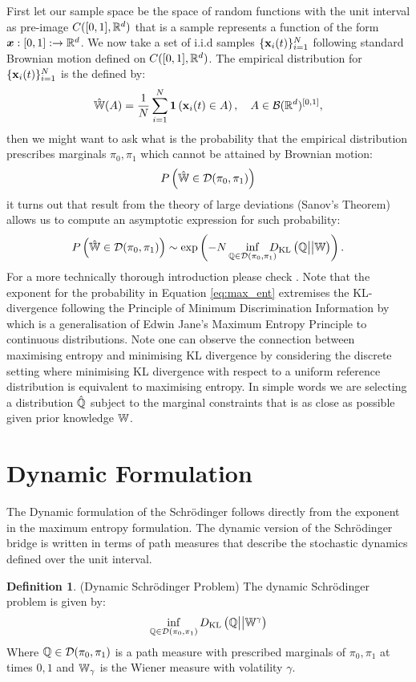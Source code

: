 \documentclass[a4paper,12pt,twoside,openright]{report}
\theoremstyle{definition}
\newtheorem{definition}{Definition}[section]
\begin{document}
First let our sample space be the space of random functions with the unit interval as pre-image $C([0,1], {\mathbb{R}}^d)$ that is a sample  represents a function of the form ${\bm{x}} : [0, 1]:  \rightarrow {\mathbb{R}}^d$.  We now take a set of i.i.d samples $\{{\mathbf{x}}_{i}(t)\}_{i=1}^N$ following standard Brownian motion defined on $C([0,1], {\mathbb{R}}^d)$. The empirical distribution for $\{{\mathbf{x}}_{i}(t)\}_{i=1}^N$ is the defined by:
\begin{align}\label{eq:empirical}
    \hat{\mathbb{W}}(A) = \frac{1}{N}\sum_{i=1}^N {\bm{1}}\left({\mathbf{x}}_i(t) \in A\right)  , \quad A \in {\mathcal{B}}({\mathbb{R}}^d)^{[0,1]},
\end{align}
then we might want to ask what is the probability that the empirical distribution prescribes marginals $\pi_0, \pi_1$ which cannot be attained by Brownian motion:
\begin{align}
    {P}\left(\hat{\mathbb{W}} \in \mathcal{D}(\pi_0, \pi_1) \right)
\end{align}
it turns out that result from the theory of large deviations (Sanov's Theorem) allows us to compute an asymptotic expression for such probability:
\begin{align} \label{eq:max_ent}
    {P}\left(\hat{\mathbb{W}} \in \mathcal{D}(\pi_0, \pi_1) \right) \sim \exp\left(-N\inf_{{\mathbb{Q}} \in {\mathcal{D}}(\pi_0, \pi_1)} \!\!\!\!\!D_{\mathrm{KL}}\left({\mathbb{Q}} \big|\big| \mathbb{W}\right)\right).
\end{align}
For a more technically thorough introduction please check \cite{leonard2013survey}. Note that the exponent for the probability in Equation \ref{eq:max_ent} extremises the KL-divergence following the Principle of Minimum Discrimination Information by \cite{kullback1997information} which is a generalisation of Edwin Jane's Maximum Entropy Principle \citep{jaynes1957information,jaynes2003probability} to continuous distributions. Note one can observe the connection between maximising entropy and minimising KL divergence by considering the discrete setting where minimising KL divergence with respect to a uniform reference distribution is equivalent to maximising entropy. In simple words we are selecting a distribution $\hat{{\mathbb{Q}}}$ subject to the marginal constraints that is as close as possible given prior knowledge $\mathbb{W}$.

\section{Dynamic Formulation}
The Dynamic formulation of the Schrödinger follows directly from the exponent in the maximum entropy formulation.  The dynamic version of the Schrödinger bridge is written in terms of path measures that describe the stochastic dynamics defined over the unit interval.
\begin{definition}
    (Dynamic Schrödinger Problem) The dynamic Schrödinger problem is given by:
    \begin{align}
        \inf_{{\mathbb{Q}} \in {\mathcal{D}}(\pi_0, \pi_1)} D_{\mathrm{KL}}\left({\mathbb{Q}} \big|\big| \mathbb{W}^{\gamma}\right)
    \end{align}
    Where ${\mathbb{Q}} \in {\mathcal{D}}(\pi_0, \pi_1)$ is a path measure with prescribed marginals of $\pi_0, \pi_1$ at times $0, 1$ and $\mathbb{W}_{\gamma}$ is the Wiener measure with volatility $\gamma$. 
\end{definition}
\end{document}
